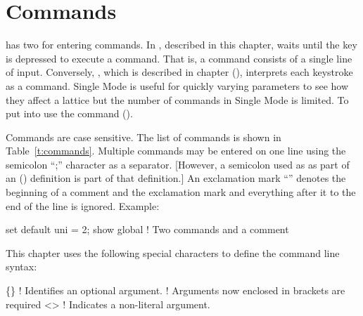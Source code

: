 %

\chapter{Commands}
\label{c:command}

\tao has two  for entering commands. In , described in this chapter, \tao
waits until the  key is depressed to execute a command. That is, a command consists of a
single line of input. Conversely, , which is described in  chapter
(), interprets each keystroke as a command. Single Mode is useful for quickly varying
parameters to see how they affect a lattice but the number of commands in Single Mode is limited. To
put \tao into  use the  command ().

Commands are case sensitive. The list of commands is shown in Table~\ref{t:commands}. Multiple
commands may be entered on one line using the semicolon ``;'' character as a separator.  [However, a
semicolon used as as part of an  () definition is part of that definition.]
An exclamation mark ``\vn{!}''  denotes the beginning of a comment and the exclamation mark and
everything after it to the end of the line is ignored.  Example:
\begin{example}
  set default uni = 2; show global  ! Two commands and a comment
\end{example}

This chapter uses the following special characters to define the command line syntax:
\begin{example}
  \{\}        ! Identifies an optional argument.
            !   Arguments now enclosed in brackets are required
  <>        ! Indicates a non-literal argument.
\end{example}

